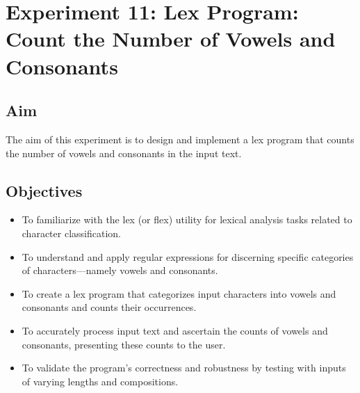 \documentclass[12pt]{article}
\begin{document}
\newpage
\section*{Experiment 11: Lex Program: Count the Number of Vowels and Consonants}

\subsection*{Aim}
The aim of this experiment is to design and implement a lex program that counts the number of vowels and consonants in the input text.

\subsection*{Objectives}
\begin{itemize}
    \item To familiarize with the lex (or flex) utility for lexical analysis tasks related to character classification.
    \item To understand and apply regular expressions for discerning specific categories of characters—namely vowels and consonants.
    \item To create a lex program that categorizes input characters into vowels and consonants and counts their occurrences.
    \item To accurately process input text and ascertain the counts of vowels and consonants, presenting these counts to the user.
    \item To validate the program's correctness and robustness by testing with inputs of varying lengths and compositions.
\end{itemize}
\end{document}
